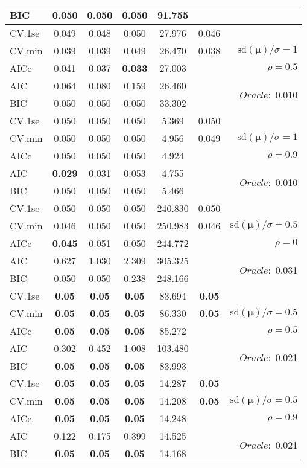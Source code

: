 \begin{table}
\begin{center}
\begin{tabular}{l*{5}{c}|r}
BIC & 0.050 & 0.050 & 0.050 & 91.755 & &  \\
 \hline 
CV.1se & 0.049 & 0.048 & 0.050 & 27.976 & 0.046 & \\
CV.min & 0.039 & 0.039 & 0.049 & 26.470 & 0.038 &  $\mathrm{sd}(\mathbf{\mu})/\sigma=1$ \\
AICc & 0.041 & 0.037 & {\bf 0.033} & 27.003 & & $\rho=0.5$ \\
AIC & 0.064 & 0.080 & 0.159 & 26.460 & &  \multirow{2}{*}{$Oracle: $ 0.010} \\
BIC & 0.050 & 0.050 & 0.050 & 33.302 & &  \\
 \hline 
CV.1se & 0.050 & 0.050 & 0.050 & 5.369 & 0.050 & \\
CV.min & 0.050 & 0.050 & 0.050 & 4.956 & 0.049 &  $\mathrm{sd}(\mathbf{\mu})/\sigma=1$ \\
AICc & 0.050 & 0.050 & 0.050 & 4.924 & & $\rho=0.9$ \\
AIC & {\bf 0.029} & 0.031 & 0.053 & 4.755 & &  \multirow{2}{*}{$Oracle: $ 0.010} \\
BIC & 0.050 & 0.050 & 0.050 & 5.466 & &  \\
 \hline 
CV.1se & 0.050 & 0.050 & 0.050 & 240.830 & 0.050 & \\
CV.min & 0.046 & 0.050 & 0.050 & 250.983 & 0.046 &  $\mathrm{sd}(\mathbf{\mu})/\sigma=0.5$ \\
AICc & {\bf 0.045} & 0.051 & 0.050 & 244.772 & & $\rho=0$ \\
AIC & 0.627 & 1.030 & 2.309 & 305.325 & &  \multirow{2}{*}{$Oracle: $ 0.031} \\
BIC & 0.050 & 0.050 & 0.238 & 248.166 & &  \\
 \hline 
CV.1se & {\bf 0.05} & {\bf 0.05} & {\bf 0.05} & 83.694 & {\bf 0.05} & \\
CV.min & {\bf 0.05} & {\bf 0.05} & {\bf 0.05} & 86.330 & {\bf 0.05} &  $\mathrm{sd}(\mathbf{\mu})/\sigma=0.5$ \\
AICc & {\bf 0.05} & {\bf 0.05} & {\bf 0.05} & 85.272 & & $\rho=0.5$ \\
AIC & 0.302 & 0.452 & 1.008 & 103.480 & &  \multirow{2}{*}{$Oracle: $ 0.021} \\
BIC & {\bf 0.05} & {\bf 0.05} & {\bf 0.05} & 83.993 & &  \\
 \hline 
CV.1se & {\bf 0.05} & {\bf 0.05} & {\bf 0.05} & 14.287 & {\bf 0.05} & \\
CV.min & {\bf 0.05} & {\bf 0.05} & {\bf 0.05} & 14.208 & {\bf 0.05} &  $\mathrm{sd}(\mathbf{\mu})/\sigma=0.5$ \\
AICc & {\bf 0.05} & {\bf 0.05} & {\bf 0.05} & 14.248 & & $\rho=0.9$ \\
AIC & 0.122 & 0.175 & 0.399 & 14.525 & &  \multirow{2}{*}{$Oracle: $ 0.021} \\
BIC & {\bf 0.05} & {\bf 0.05} & {\bf 0.05} & 14.168 & &  \\
 \hline 
\end{tabular}
\end{center}
\vspace{-1cm}
\end{table}




